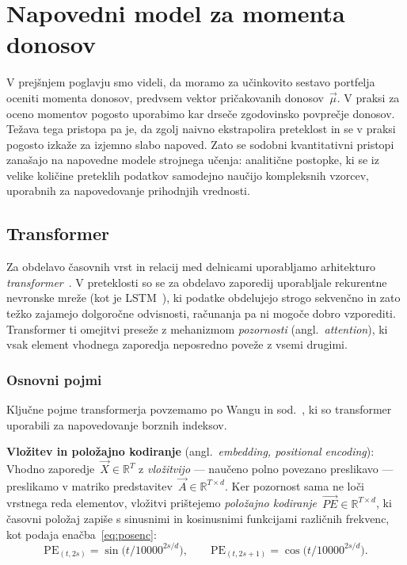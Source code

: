 \chapter{Napovedni model za momenta donosov}
\label{ch:model}

V prejšnjem poglavju smo videli, da moramo za učinkovito sestavo portfelja oceniti momenta donosov, predvsem vektor pričakovanih donosov~$\vec{\mu}$. V praksi za oceno momentov pogosto uporabimo kar drseče zgodovinsko povprečje donosov. Težava tega pristopa pa je, da zgolj naivno ekstrapolira preteklost in se v praksi pogosto izkaže za izjemno slabo napoved. Zato se sodobni kvantitativni pristopi zanašajo na napovedne modele strojnega učenja: analitične postopke, ki se iz velike količine preteklih podatkov samodejno naučijo kompleksnih vzorcev, uporabnih za napovedovanje prihodnjih vrednosti.

\section{Transformer}

Za obdelavo časovnih vrst in relacij med delnicami uporabljamo arhitekturo \emph{transformer}~\cite{vaswani2017}. V preteklosti so se za obdelavo zaporedij uporabljale rekurentne nevronske mreže (kot je LSTM~\cite{hochreiter1997lstm}), ki podatke obdelujejo strogo sekvenčno in zato težko zajamejo dolgoročne odvisnosti, računanja pa ni mogoče dobro vzporediti. Transformer ti omejitvi preseže z mehanizmom \emph{pozornosti} (angl.\ \emph{attention}), ki vsak element vhodnega zaporedja neposredno poveže z vsemi drugimi.

\subsection{Osnovni pojmi}

Ključne pojme transformerja povzemamo po Wangu in sod.~\cite{wang2022}, ki so transformer uporabili za napovedovanje borznih indeksov.

\noindent\textbf{Vložitev in položajno kodiranje} (angl.\ \emph{embedding, positional encoding}): Vhodno zaporedje~$\vec{X}\in\mathbb{R}^{T}$ z \emph{vložitvijo} --- naučeno polno povezano preslikavo --- preslikamo v matriko predstavitev~$\vec{A}\in\mathbb{R}^{T\times d}$. Ker pozornost sama ne loči vrstnega reda elementov, vložitvi prištejemo \emph{položajno kodiranje}~$\vec{PE}\in\mathbb{R}^{T\times d}$, ki časovni položaj zapiše s sinusnimi in kosinusnimi funkcijami različnih frekvenc, kot podaja enačba~\eqref{eq:posenc}:
\begin{equation}
\label{eq:posenc}
  \mathrm{PE}_{(t,2s)}=\sin\!\big(t/10000^{2s/d}\big),\qquad
  \mathrm{PE}_{(t,2s+1)}=\cos\!\big(t/10000^{2s/d}\big).
\end{equation}

